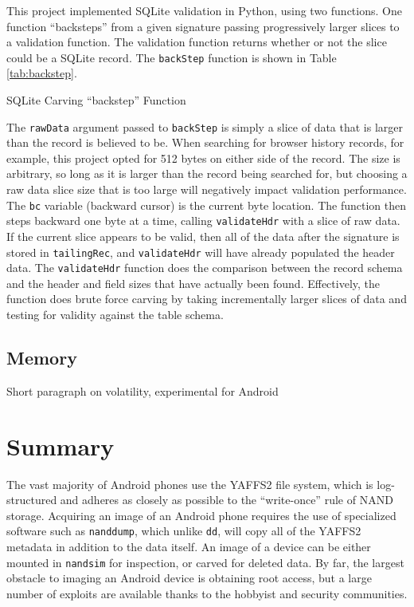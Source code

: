 This project implemented SQLite validation in Python, using two functions.  One function ``backsteps'' from a given signature
passing progressively larger slices to a validation function.  The validation function returns whether or not the slice could be a
SQLite record.  The \texttt{backStep} function is shown in Table \ref{tab:backstep}. 

\begin{table}[htb]

\caption{SQLite Carving ``backstep'' Function}
\label{tab:backstep}
\end{table}

The \texttt{rawData} argument passed to \texttt{backStep} is simply a slice of data that is larger than the record is believed to
be.  When searching for browser history records, for example, this project opted for 512 bytes on either side of the record.  The
size is arbitrary, so long as it is larger than the record being searched for, but choosing a raw data slice size that is too large
will negatively impact validation performance.  The \texttt{bc} variable (backward cursor) is the current byte location.  The
function then steps backward one byte at a time, calling \texttt{validateHdr} with a slice of raw data.  If the current
slice appears to be valid, then all of the data after the signature is stored in \texttt{tailingRec}, and \texttt{validateHdr} will
have already populated the header data.  The \texttt{validateHdr} function does the comparison between the record schema and
the header and field sizes that have actually been found.  Effectively, the function does brute force carving by taking
incrementally larger slices of data and testing for validity against the table schema.

\subsection{Memory}
Short paragraph on volatility, experimental for Android

\section{Summary}

The vast majority of Android phones use the YAFFS2 file system, which is log-structured and adheres as closely as possible to the
``write-once'' rule of NAND storage. Acquiring an image of an Android phone requires the use of specialized software such as
\texttt{nanddump}, which unlike \texttt{dd}, will copy all of the YAFFS2 metadata in addition to the data itself. An image of a
device can be either mounted in \texttt{nandsim} for inspection, or carved for deleted data. By far, the largest obstacle to imaging
an Android device is obtaining root access, but a large number of exploits are available thanks to the hobbyist and security
communities.

